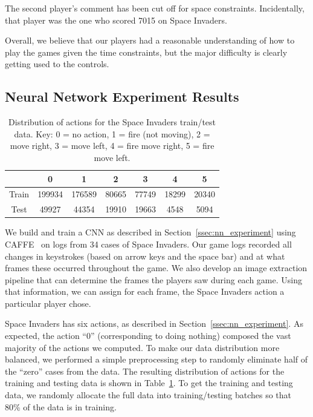 \documentclass[letterpaper, 10 pt, conference]{ieeeconf}  %
\begin{document}
The second player's comment has been cut off for space constraints. Incidentally, that player was
the one who scored 7015 on Space Invaders.

Overall, we believe that our players had a reasonable understanding of how to play the games given
the time constraints, but the major difficulty is clearly getting used to the controls.

\subsection{Neural Network Experiment Results}\label{ssec:nn_results}

\begin{table}[t]
\centering
\begin{tabular}{|c||c|c|c|c|c|c|}
\hline
  & 0 & 1 & 2 & 3 & 4 & 5 \\
\hline
Train & 199934 & 176589 & 80665 & 77749 & 18299 & 20340 \\
Test  & 49927  & 44354 & 19910 & 19663 & 4548 & 5094 \\
\hline
\end{tabular}
\caption{Distribution of actions for the Space Invaders train/test data. Key: 0 = no action, 1 =
fire (not moving), 2 = move right, 3 = move left, 4 = fire move right, 5 = fire move left.}
\label{tab:data_distribution}
\end{table}

We build and train a CNN as described in Section~\ref{ssec:nn_experiment} using CAFFE~\cite{caffe}
on logs from 34 cases of Space Invaders. Our game logs recorded all changes in keystrokes (based on
arrow keys and the space bar) and at what frames these occurred throughout the game. We also develop
an image extraction pipeline that can determine the frames the players saw during each game. Using
that information, we can assign for each frame, the Space Invaders action a particular player chose.

Space Invaders has six actions, as described in Section~\ref{ssec:nn_experiment}.   As expected, the
action ``0'' (corresponding to doing nothing) composed the vast majority of the actions we computed.
To make our data distribution more balanced, we performed a simple preprocessing step to randomly
eliminate half of the ``zero'' cases from the data. The resulting distribution of actions for the
training and testing data is shown in Table~\ref{tab:data_distribution}.  To get the training and
testing data, we randomly allocate the full data into training/testing batches so that 80\% of the
data is in training.
\end{document}
